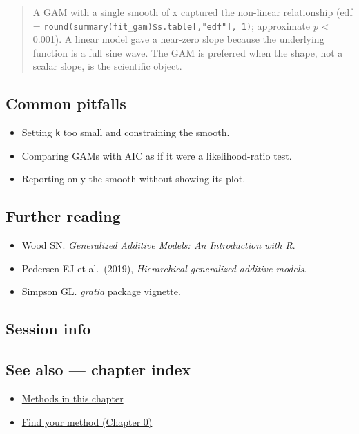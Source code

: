 \documentclass[
]{article}
\newenvironment{Shaded}{\begin{snugshade}}{\end{snugshade}}
\providecommand{\tightlist}{%
  \setlength{\itemsep}{0pt}\setlength{\parskip}{0pt}}
\begin{document}
\begin{quote}
A GAM with a single smooth of x captured the non-linear relationship
(edf = \texttt{round(summary(fit\_gam)\$s.table{[},"edf"{]},\ 1)};
approximate \emph{p} \textless{} 0.001). A linear model gave a near-zero
slope because the underlying function is a full sine wave. The GAM is
preferred when the shape, not a scalar slope, is the scientific object.
\end{quote}

\subsection{Common pitfalls}\label{common-pitfalls}

\begin{itemize}
\tightlist
\item
  Setting \texttt{k} too small and constraining the smooth.
\item
  Comparing GAMs with AIC as if it were a likelihood-ratio test.
\item
  Reporting only the smooth without showing its plot.
\end{itemize}

\subsection{Further reading}\label{further-reading}

\begin{itemize}
\tightlist
\item
  Wood SN. \emph{Generalized Additive Models: An Introduction with R}.
\item
  Pedersen EJ et al.~(2019), \emph{Hierarchical generalized additive
  models}.
\item
  Simpson GL. \emph{gratia} package vignette.
\end{itemize}

\subsection{Session info}\label{session-info}

\begin{Shaded}
\begin{Highlighting}[]

\end{Highlighting}
\end{Shaded}

\subsection{See also --- chapter index}\label{see-also-chapter-index}

\begin{itemize}
\tightlist
\item
  \href{../index.Rmd}{Methods in this chapter}
\item
  \href{../../../ch00-find-your-method.Rmd}{Find your method (Chapter
  0)}
\end{itemize}
\end{document}
